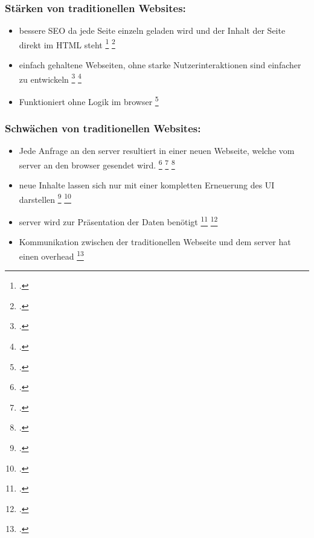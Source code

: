 \subsubsection*{Stärken von traditionellen Websites:}

\begin{itemize}
    \item bessere \ac{SEO} da jede Seite einzeln geladen wird und der Inhalt der Seite direkt im \ac{HTML} steht \footcite[Vgl. ][Seite 7]{Smith2022} \footcite[Vgl.][Seite 143]{Irudayaraj2019}
    \item einfach gehaltene Webseiten, ohne starke Nutzerinteraktionen sind einfacher zu entwickeln \footcite[Vgl. ][Seite 7]{Smith2022} \footcite[Vgl.][Seite 143]{Irudayaraj2019}
    \item Funktioniert ohne Logik im \gls{browser} \footcite[Vgl. ][Seite 7]{Smith2022}
\end{itemize}

\subsubsection*{Schwächen von traditionellen Websites:}

\begin{itemize}
    \item Jede Anfrage an den \gls{server} resultiert in einer neuen Webseite, welche vom \gls{server} an den \gls{browser} gesendet wird. \footcite[Vgl. ][Seite 5]{Flanagan2011} \footcite[Vgl. ][Seite 33]{Robbins2018} \footcite[Vgl.][Seite 5]{Solovei2018}
    \item neue Inhalte lassen sich nur mit einer kompletten Erneuerung des \ac{UI} darstellen \footcite[Vgl. ][Seite 6]{Flanagan2011} \footcite[Vgl. ][Seite 33]{Robbins2018}
    \item \gls{server} wird zur Präsentation der Daten benötigt \footcite[Vgl. ][Seite 7]{Flanagan2011} \footcite[Vgl. ][Seite 33]{Robbins2018}
    \item Kommunikation zwischen der traditionellen Webseite und dem \gls{server} hat einen \gls{overhead} \footcite[Vgl. ][Seite 7]{Flanagan2011}
\end{itemize}

